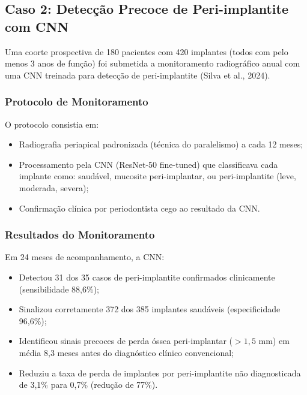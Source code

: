 
\subsection{Caso 2: Detecção Precoce de Peri-implantite com CNN}

Uma coorte prospectiva de 180 pacientes com 420 implantes (todos com pelo menos 3 anos de função) foi submetida a monitoramento radiográfico anual com uma CNN treinada para detecção de peri-implantite (Silva et al., 2024).

\subsubsection{Protocolo de Monitoramento}

O protocolo consistia em:
\begin{itemize}
    \item Radiografia periapical padronizada (técnica do paralelismo) a cada 12 meses;
    \item Processamento pela CNN (ResNet-50 fine-tuned) que classificava cada implante como: saudável, mucosite peri-implantar, ou peri-implantite (leve, moderada, severa);
    \item Confirmação clínica por periodontista cego ao resultado da CNN.
\end{itemize}

\subsubsection{Resultados do Monitoramento}

Em 24 meses de acompanhamento, a CNN:
\begin{itemize}
    \item Detectou 31 dos 35 casos de peri-implantite confirmados clinicamente (sensibilidade 88,6\%);
    \item Sinalizou corretamente 372 dos 385 implantes saudáveis (especificidade 96,6\%);
    \item Identificou sinais precoces de perda óssea peri-implantar ($>1,5$ mm) em média 8,3 meses antes do diagnóstico clínico convencional;
    \item Reduziu a taxa de perda de implantes por peri-implantite não diagnosticada de 3,1\% para 0,7\% (redução de 77\%).
\end{itemize}

